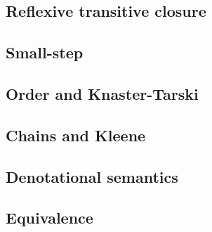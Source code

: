 \documentclass[
  a4paper, 
  10pt, 
  parskip=half, 
  DIV=20,
  toc=bibliography,
  usegeometry,
]{scrartcl}
\begin{document}


\subsection{Reflexive transitive closure}



\subsection{Small-step}



\subsection{Order and Knaster-Tarski}



\subsection{Chains and Kleene}



\subsection{Denotational semantics}



\subsection{Equivalence}






\end{document}
